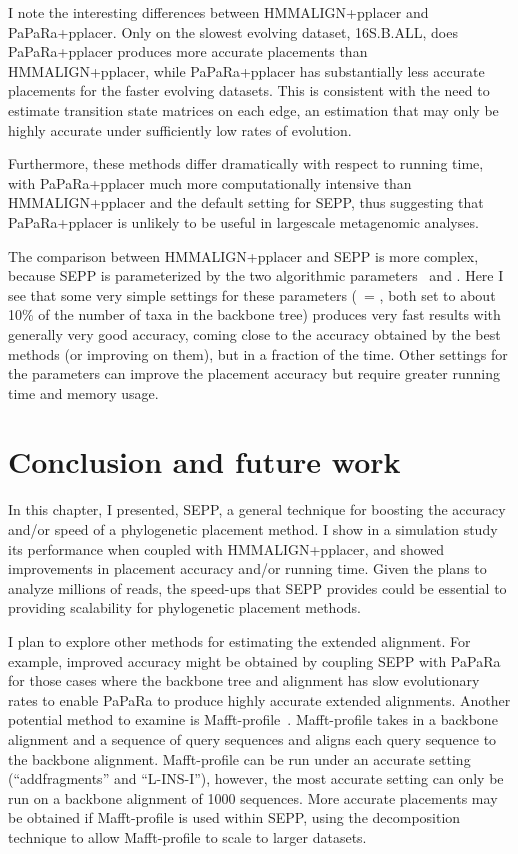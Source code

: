 I note the interesting differences between
HMMALIGN+pplacer and PaPaRa+pplacer.  Only on the slowest evolving
dataset, 16S.B.ALL,  does
PaPaRa+pplacer produces more accurate placements than HMMALIGN+pplacer,
while PaPaRa+pplacer has substantially less accurate placements
for the faster evolving datasets.
This is consistent with the need to estimate transition state
matrices on each edge, an estimation that may only be highly
accurate under sufficiently low rates of evolution.

Furthermore, these methods differ dramatically with respect to
running time, with PaPaRa+pplacer much more computationally
intensive than HMMALIGN+pplacer and the default setting for
SEPP, thus suggesting that PaPaRa+pplacer is unlikely to
be useful in largescale metagenomic analyses.

The comparison between HMMALIGN+pplacer and SEPP is more
complex, because SEPP is parameterized by the two
algorithmic parameters \ssa~and \ssp. Here I see that some
very simple settings for these parameters (\ssa~= \ssp, both set to
about 10\% of the number of taxa in the backbone tree) produces very
fast results with generally very good accuracy, coming close to the
accuracy obtained by the best methods (or improving on them), but
in a fraction of the time.  
Other settings for the parameters can improve the placement accuracy but
require greater running time and memory usage.  


\section{Conclusion and future work}\label{sepp:conclusion}
In this chapter, I presented, SEPP, a general technique for boosting
the accuracy and/or speed of a phylogenetic placement method. 
I show in a simulation study its
performance when coupled with HMMALIGN+pplacer, and showed improvements
in placement accuracy and/or running time. Given the plans to analyze millions of reads, the speed-ups that SEPP provides could be essential to providing scalability for
phylogenetic placement methods.

I plan to explore other methods for estimating the extended alignment.
For example, improved accuracy might be obtained by
coupling SEPP with PaPaRa for those cases where
the backbone tree and alignment has slow evolutionary
rates to enable PaPaRa to produce highly accurate extended alignments.
Another potential method to examine is Mafft-profile~\cite{Katoh2012}.
Mafft-profile takes in a backbone alignment and a sequence of query sequences and aligns each query sequence to the backbone alignment.  Mafft-profile can be run under an accurate setting (``addfragments'' and ``L-INS-I''), however,
the most accurate setting can only be run on a backbone alignment of 1000 sequences.  More accurate placements may be obtained if Mafft-profile is used within SEPP, using the decomposition technique to allow Mafft-profile to scale to larger datasets.

